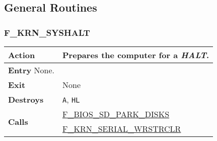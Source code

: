 \subsection{General Routines}

\subsubsection{F\_KRN\_SYSHALT}
\label{func:fkrnsyshalt}
\begin{tabular}{l p{15cm}}
    \hline\multirow[t]{4}{4em}{\textbf{Action}}
    & Prepares the computer for a \textit{HALT}.\\
    \hline\textbf{Entry} None.\\
    \hline\textbf{Exit} & None \\
    \hline\textbf{Destroys} & \texttt{A}, \texttt{HL} \\
    \hline\multirow[t]{2}{4em}{\textbf{Calls}}
    & \hyperref[func:fbiossdparkdisks]{F\_BIOS\_SD\_PARK\_DISKS}\\
    & \hyperref[func:fkrnserialwrstrclr]{F\_KRN\_SERIAL\_WRSTRCLR}\\
    \hline
\end{tabular}